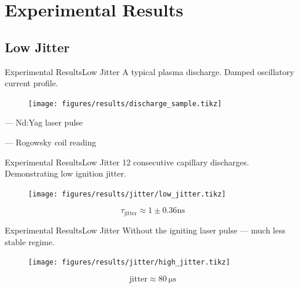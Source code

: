 \documentclass[dvipsnames]{beamer}
\begin{document}
\section{Experimental Results}
\subsection{Low Jitter}
\begin{frame}{Experimental Results}{Low Jitter}
A typical plasma discharge. Damped oscillatory current profile.
\begin{figure}
    \texttt{[image: figures/results/discharge\_sample.tikz]}
\end{figure}
 --- Nd:Yag laser pulse

 --- Rogowsky coil reading
\end{frame}
\begin{frame}{Experimental Results}{Low Jitter}
\small{12 consecutive capillary discharges. Demonstrating low ignition jitter.}
\begin{figure}
\texttt{[image: figures/results/jitter/low\_jitter.tikz]}
\end{figure}
$$\tau_\text{jitter}\approx 1\pm 0.36 \si{\ns}$$
\end{frame}
\begin{frame}{Experimental Results}{Low Jitter}
Without the igniting laser pulse --- much less stable regime.
\begin{figure}
 \texttt{[image: figures/results/jitter/high\_jitter.tikz]}
\end{figure}
$$\text{jitter}\approx \SI{80}{\us}$$
\end{frame}
\end{document}
